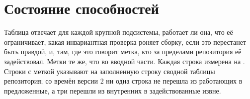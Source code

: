 \section{Состояние способностей}
\label{app:status}

Таблица отвечает для каждой крупной подсистемы, работает ли она, что её ограничивает, какая
инвариантная проверка роняет сборку, если это перестанет быть правдой, и, там, где это говорит
метка, кто за пределами репозитория её задействовал. Метки те же, что во вводной части. Каждая
строка измерена на . Строки с меткой \sWit{} указывают на заполненную строку
сводной таблицы репозитория; со времён версии 2 ни одна строка не перешла из работающих в
предложенные, а три перешли из внутренних в задействованные извне.

